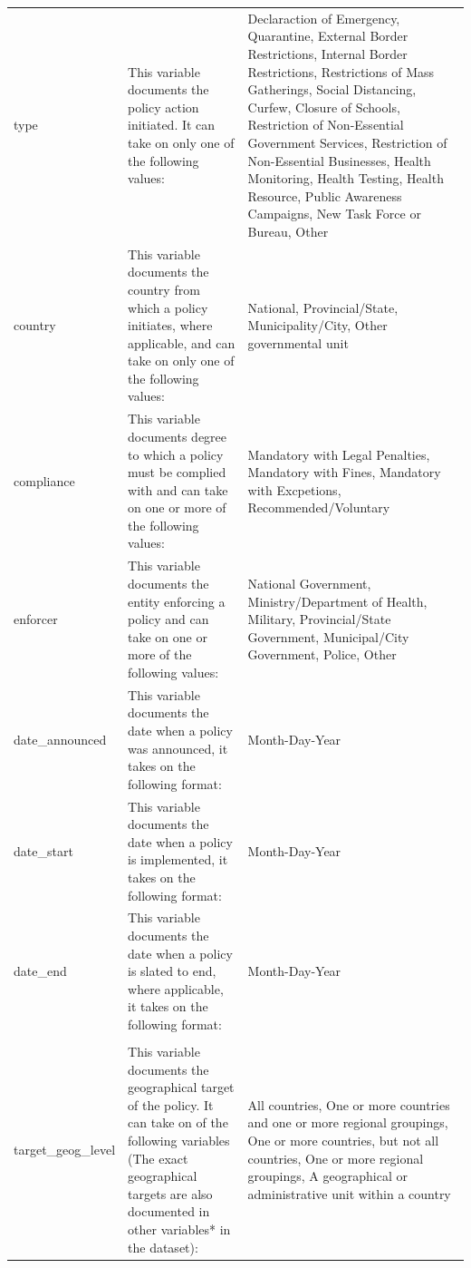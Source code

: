 \documentclass[]{article}
\begin{document}
\begin{ThreePartTable}
\begin{longtable}{>{\bfseries\raggedright\arraybackslash}p{3.5cm}>{\raggedright\arraybackslash}p{5cm}>{\raggedright\arraybackslash}p{8.5cm}}
\hspace{1em}type & This variable documents the policy action initiated. It can take on only one of the following values: & Declaraction of Emergency, Quarantine, External Border Restrictions, Internal Border Restrictions, Restrictions of Mass Gatherings, Social Distancing, Curfew, Closure of Schools, Restriction of Non-Essential Government Services, Restriction of Non-Essential Businesses, Health Monitoring, Health Testing, Health Resource, Public Awareness Campaigns, New Task Force or Bureau, Other\\
\rowcolor{gray!6}  \hspace{1em}country & This variable documents the country from which a policy initiates, where applicable, and can take on only one of the following values: & National, Provincial/State, Municipality/City, Other governmental unit\\
\hspace{1em}compliance & This variable documents degree to which a policy must be complied with and can take on one or more of the following values: & Mandatory with Legal Penalties, Mandatory with Fines, Mandatory with Excpetions, Recommended/Voluntary\\
\rowcolor{gray!6}  \hspace{1em}enforcer & This variable documents the entity enforcing a policy and can take on one or more of the following values: & National Government, Ministry/Department of Health, Military, Provincial/State Government, Municipal/City Government, Police, Other\\
\hspace{1em}date\_announced & This variable documents the date when a policy was announced, it takes on the following format: & Month-Day-Year\\
\rowcolor{gray!6}  \hspace{1em}date\_start & This variable documents the date when a policy is implemented, it takes on the following format: & Month-Day-Year\\
\hspace{1em}date\_end & This variable documents the date when a policy is slated to end, where applicable, it takes on the following format: & Month-Day-Year\\
\rowcolor{gray!6}  \addlinespace[0.3em]
\multicolumn{3}{l}{\textbf{Dyadic Variables}}\\
\hspace{1em}target\_geog\_level & This variable documents the geographical target of the policy. It can take on of the following variables (The exact geographical targets are also documented in other variables* in the dataset): & All countries, One or more countries and one or more regional groupings, One or more countries, but not all countries, One or more regional groupings, A geographical or administrative unit within a country\\

\end{longtable}
\end{ThreePartTable}
\end{document}
